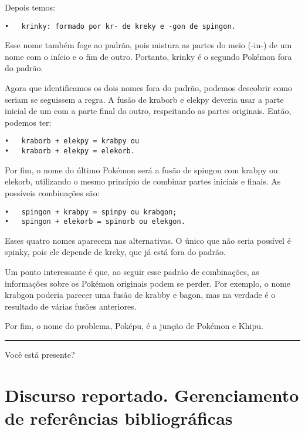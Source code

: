 \documentclass[
  letterpaper,
  DIV=11,
  numbers=noendperiod]{scrreprt}
\begin{document}
Depois temos:

\begin{verbatim}
•   krinky: formado por kr- de kreky e -gon de spingon.
\end{verbatim}

Esse nome também foge ao padrão, pois mistura as partes do meio (-in-)
de um nome com o início e o fim de outro. Portanto, krinky é o segundo
Pokémon fora do padrão.

Agora que identificamos os dois nomes fora do padrão, podemos descobrir
como seriam se seguissem a regra. A fusão de kraborb e elekpy deveria
usar a parte inicial de um com a parte final do outro, respeitando as
partes originais. Então, podemos ter:

\begin{verbatim}
•   kraborb + elekpy = krabpy ou
•   kraborb + elekpy = elekorb.
\end{verbatim}

Por fim, o nome do último Pokémon será a fusão de spingon com krabpy ou
elekorb, utilizando o mesmo princípio de combinar partes iniciais e
finais. As possíveis combinações são:

\begin{verbatim}
•   spingon + krabpy = spinpy ou krabgon;
•   spingon + elekorb = spinorb ou elekgon.
\end{verbatim}

Esses quatro nomes aparecem nas alternativas. O único que não seria
possível é spinky, pois ele depende de kreky, que já está fora do
padrão.

Um ponto interessante é que, ao seguir esse padrão de combinações, as
informações sobre os Pokémon originais podem se perder. Por exemplo, o
nome krabgon poderia parecer uma fusão de krabby e bagon, mas na verdade
é o resultado de várias fusões anteriores.

Por fim, o nome do problema, Poképu, é a junção de Pokémon e Khipu.

\begin{center}\rule{0.5\linewidth}{0.5pt}\end{center}

Você está presente?

\chapter{Discurso reportado. Gerenciamento de referências
bibliográficas}\label{discurso-reportado.-gerenciamento-de-referuxeancias-bibliogruxe1ficas}
\end{document}
